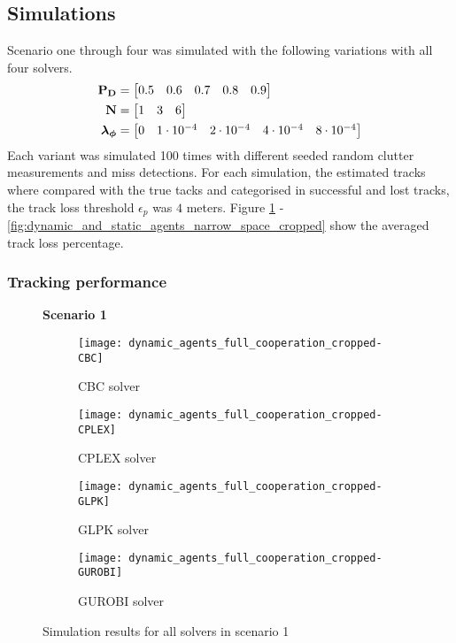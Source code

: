 \subsection{Simulations}
Scenario one through four was simulated with the following variations with all four solvers.
\begin{equation*}
\begin{split}
\boldsymbol{\mathbf{P_D}} &= \begin{bmatrix} 0.5 & 0.6 & 0.7 & 0.8 & 0.9 \end{bmatrix} \\
\boldsymbol{\mathbf{N}} &=\begin{bmatrix} 1 & 3 & 6 \end{bmatrix} \\
\boldsymbol{\mathbf{\lambda_\phi}} &=\begin{bmatrix} 0 & 1\cdot10^{-4} & 2\cdot10^{-4} & 4\cdot10^{-4} & 8\cdot10^{-4} \end{bmatrix}
\end{split}
\end{equation*}
Each variant was simulated 100 times with different seeded random clutter measurements and miss detections. For each simulation, the estimated tracks where compared with the true tacks and categorised in successful and lost tracks, the track loss threshold $\epsilon_p$ was $4$ meters. Figure \ref{fig:dynamic_agents_full_cooperation_cropped} - \ref{fig:dynamic_and_static_agents_narrow_space_cropped} show the averaged track loss percentage.

\subsubsection{Tracking performance}
\begin{figure}[H]
    \centering
    \textbf{Scenario 1}\par \medskip
    \begin{subfigure}{0.49\textwidth}
        \centering
        \texttt{[image: dynamic\_agents\_full\_cooperation\_cropped-CBC]}
        \caption{CBC solver}
    \end{subfigure}
    \begin{subfigure}{0.49\textwidth}
        \centering
        \texttt{[image: dynamic\_agents\_full\_cooperation\_cropped-CPLEX]}
        \caption{CPLEX solver}
    \end{subfigure}
    \begin{subfigure}{0.49\textwidth}
        \centering
        \texttt{[image: dynamic\_agents\_full\_cooperation\_cropped-GLPK]}
        \caption{GLPK solver}
    \end{subfigure}
    \begin{subfigure}{0.49\textwidth}
        \centering
        \texttt{[image: dynamic\_agents\_full\_cooperation\_cropped-GUROBI]}
        \caption{GUROBI solver}
    \end{subfigure}
	\caption{Simulation results for all solvers in scenario 1}
    \label{fig:dynamic_agents_full_cooperation_cropped}
\end{figure}

